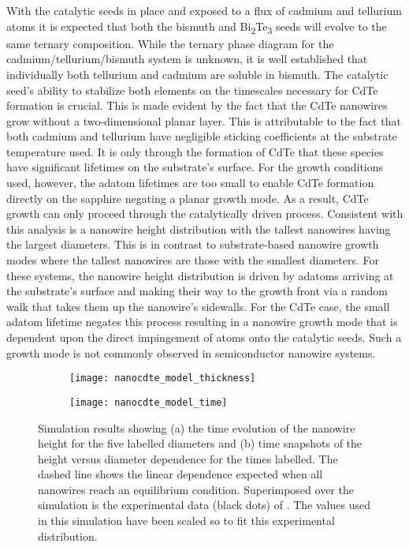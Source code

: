 With the catalytic seeds in place and exposed to a flux of cadmium and tellurium atoms it is expected that both the bismuth and Bi\textsubscript{2}Te\textsubscript{3} seeds will evolve to the same ternary composition.
While the ternary phase diagram for the cadmium/tellurium/bismuth system is unknown, it is well established that individually both tellurium and cadmium are soluble in bismuth\cite{MassalskiTBMurrayJL1986}.
The catalytic seed's ability to stabilize both elements on the timescales necessary for CdTe formation is crucial.
This is made evident by the fact that the CdTe nanowires grow without a two-dimensional planar layer.
This is attributable to the fact that both cadmium and tellurium have negligible sticking coefficients at the substrate temperature used.
It is only through the formation of CdTe that these species have significant lifetimes on the substrate's surface.
For the growth conditions used, however, the adatom lifetimes are too small to enable CdTe formation directly on the sapphire negating a planar growth mode.
As a result, CdTe growth can only proceed through the catalytically driven process.
Consistent with this analysis is a nanowire height distribution with the tallest nanowires having the largest diameters.
This is in contrast to substrate-based nanowire growth modes where the tallest nanowires are those with the smallest diameters.
For these systems, the nanowire height distribution is driven by adatoms arriving at the substrate's surface and making their way to the growth front via a random walk that takes them up the nanowire's sidewalls.
For the CdTe case, the small adatom lifetime negates this process resulting in a nanowire growth mode that is dependent upon the direct impingement of atoms onto the catalytic seeds.
Such a growth mode is not commonly observed in semiconductor nanowire systems.
\begin{figure}
 \centering
 \begin{subfigure}[t]{0.49\textwidth}
  \centering \texttt{[image: nanocdte\_model\_thickness]}
  \caption{\label{fig:nanocdte_model_thickness}}
 \end{subfigure}%
 \begin{subfigure}[t]{0.49\textwidth}
  \centering \texttt{[image: nanocdte\_model\_time]}
  \caption{\label{fig:nanocdte_model_time}}
 \end{subfigure}
 \caption[Simulated CdTe nanowire dimension distributions]{\label{fig:nanocdte_model}Simulation results showing (a) the time evolution of the nanowire height for the five labelled diameters and (b) time snapshots of the height versus diameter dependence for the times labelled.
  The dashed line shows the linear dependence expected when all nanowires reach an equilibrium condition.
  Superimposed over the simulation is the experimental data (black dots) of .
  The values used in this simulation have been scaled so to fit this experimental distribution.}
\end{figure}

